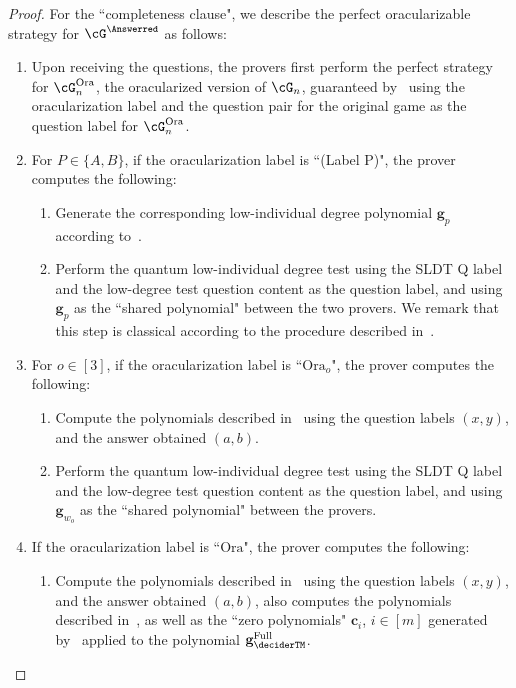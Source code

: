 \begin{proof}
For the ``completeness clause", we describe the perfect oracularizable strategy for $\cG^{\Answerred}$ as follows:
\begin{enumerate}
	\item Upon receiving the questions, the provers first perform the perfect strategy for $\cG_n^{\text{Ora}}$, the oracularized version of $\cG_n$, guaranteed by~ using the oracularization label and the question pair for the original game as the question label for $\cG_n^{\text{Ora}}$.
	\item For $P \in \{A,B\}$, if the oracularization label is ``(Label P)", the prover computes the following:
	\begin{enumerate}
		\item Generate the corresponding low-individual degree polynomial $\textbf{g}_{p}$ according to~. 
		\item Perform the quantum low-individual degree test using the SLDT Q label and the low-degree test question content as the question label, and using $\textbf{g}_{p}$ as the ``shared polynomial" between the two provers. We remark that this step is classical according to the procedure described in~. 
	\end{enumerate}
	\item For $o \in [3]$, if the oracularization label is ``$\text{Ora}_o$", the prover computes the following:
	\begin{enumerate}
		\item Compute the polynomials described in~ using the question labels $(x,y)$, and the answer obtained $(a,b)$. 
		\item Perform the quantum low-individual degree test using the SLDT Q label and the low-degree test question content as the question label, and using $\textbf{g}_{w_o}$ as the ``shared polynomial" between the provers.
	\end{enumerate}
	\item If the oracularization label is ``$\text{Ora}$", the prover computes the following:
	\begin{enumerate}
		\item Compute the polynomials described in~ using the question labels $(x,y)$, and the answer obtained $(a,b)$, also computes the polynomials described in~, as well as the ``zero polynomials" $\textbf{c}_i$, $i \in [m]$ generated by~ applied to the polynomial $\textbf{g}_{\deciderTM}^{\text{Full}}$. 

\end{enumerate}
\end{enumerate}
\end{proof}
